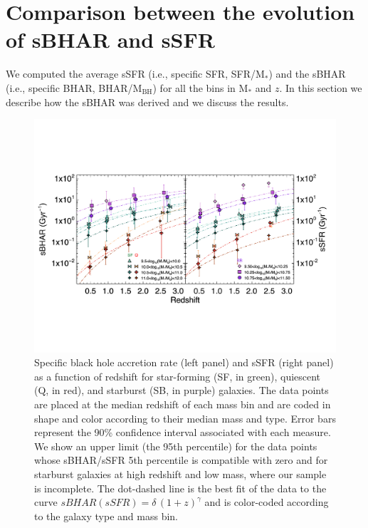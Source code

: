 \section{Comparison between the evolution of sBHAR and sSFR} \label{sec:specifics}
%
We computed the average sSFR (i.e., specific SFR, SFR/M$_*$) and the sBHAR (i.e., specific BHAR, BHAR/M$_\text{BH}$) for all the bins in M$_*$ and $z$. In this section we describe how the sBHAR was derived and we discuss the results.

   \begin{figure}
   \centering
   \includegraphics[trim={0 4cm 0.5cm 5.1cm}, clip,width=\textwidth]{Figs/Chapter2/sBHAR_all.pdf}
      \caption{ Specific black hole accretion rate (left panel) and sSFR (right panel) as a function of redshift for star-forming (SF, in green), quiescent (Q, in red), and starburst (SB, in purple) galaxies. The data points are placed at the median redshift of each mass bin and are coded in shape and color according to their median mass and type. Error bars represent the 90\% confidence interval associated with each measure. We show an upper limit (the 95th percentile) for the data points whose sBHAR/sSFR 5th percentile is compatible with zero and for starburst galaxies at high redshift and low mass, where our sample is incomplete. The dot-dashed line is the best fit of the data to the curve $sBHAR(sSFR)=\delta\, (1+z)^{\gamma}$ and is color-coded according to the galaxy type and mass bin.
              }
         \label{fig:sBHAR_all}
   \end{figure}
%
